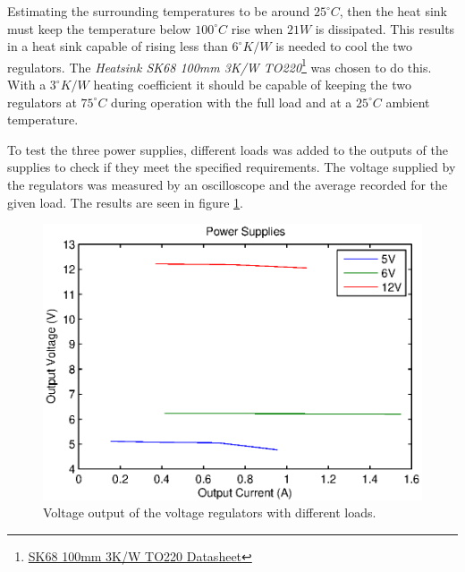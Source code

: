 Estimating the surrounding temperatures to be around $25^{\circ} C$, then the heat sink must keep the temperature below $100^{\circ} C$ rise when $21W$ is dissipated.
This results in a heat sink capable of rising less than $6 ^{\circ}K/W$ is needed to cool the two regulators.
The \textit{Heatsink SK68 100mm 3K/W TO220}\footnote{\href{http://dk.rs-online.com/web/p/koleplader/1898482/?searchTerm=Heatsink+SK68+100mm+3K\%2FW+TO220&relevancy-data=636F3D3226696E3D4931384E44656661756C74266C753D6461266D6D3D6D61746368616C6C7061727469616C26706D3D5E5B5C707B4C7D5C707B4E647D5C707B5A737D2D2C2F255C2E5D2B2426706F3D3926736E3D592673743D4B4559574F52445F4D554C54495F414C5048415F4E554D455249432673633D592677633D4E4F4E45267573743D4865617473696E6B20534B3638203130306D6D20334B2F5720544F32323026}{SK68 100mm 3K/W TO220 Datasheet}} was chosen to do this.
With a $3^{\circ}K/W$ heating coefficient it should be capable of keeping the two regulators at $75^{\circ}C$ during operation with the full load and at a $25^{\circ}C$ ambient temperature.



To test the three power supplies, different loads was added to the outputs of the supplies to check if they meet the specified requirements.
The voltage supplied by the regulators was measured by an oscilloscope and the average recorded for the given load.
The results are seen in figure \ref{fig:voltagesupply}.

\begin{figure}[H]
\centering
\includegraphics[width = 0.9 \textwidth]{images/powersupply_output}
\caption{Voltage output of the voltage regulators with different loads.}
\label{fig:voltagesupply}
\end{figure}

